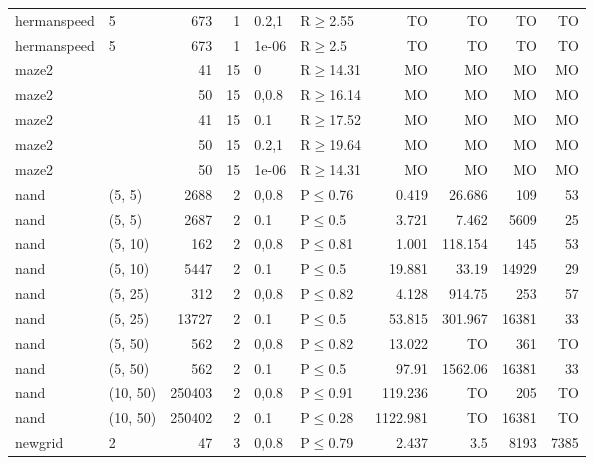 \begin{longtable}{llrrllrrrr}
 hermanspeed   & 5        &    	673 &   1 & 0.2,1 & R$\geq$2.55  & TO       & TO      & TO      & TO      \\
 hermanspeed   & 5        &    	673 &   1 & 1e-06 & R$\geq$2.5   & TO       & TO      & TO      & TO      \\
 maze2         &          &     	41 &  15 & 0     & R$\geq$14.31 & MO       & MO      & MO      & MO      \\
 maze2         &          &     	50 &  15 & 0,0.8 & R$\geq$16.14 & MO       & MO      & MO      & MO      \\
 maze2         &          &     	41 &  15 & 0.1   & R$\geq$17.52 & MO       & MO      & MO      & MO      \\
 maze2         &          &     	50 &  15 & 0.2,1 & R$\geq$19.64 & MO       & MO      & MO      & MO      \\
 maze2         &          &     	50 &  15 & 1e-06 & R$\geq$14.31 & MO       & MO      & MO      & MO      \\
 nand          & (5, 5)   &   	2688 &   2 & 0,0.8 & P$\leq$0.76  & 0.419    & 26.686  & 109     & 53      \\
 nand          & (5, 5)   &   	2687 &   2 & 0.1   & P$\leq$0.5   & 3.721    & 7.462   & 5609    & 25      \\
 nand          & (5, 10)  &    	162 &   2 & 0,0.8 & P$\leq$0.81  & 1.001    & 118.154 & 145     & 53      \\
 nand          & (5, 10)  &   	5447 &   2 & 0.1   & P$\leq$0.5   & 19.881   & 33.19   & 14929   & 29      \\
 nand          & (5, 25)  &    	312 &   2 & 0,0.8 & P$\leq$0.82  & 4.128    & 914.75  & 253     & 57      \\
 nand          & (5, 25)  &  	13727 &   2 & 0.1   & P$\leq$0.5   & 53.815   & 301.967 & 16381   & 33      \\
 nand          & (5, 50)  &    	562 &   2 & 0,0.8 & P$\leq$0.82  & 13.022   & TO      & 361     & TO      \\
 nand          & (5, 50)  &    	562 &   2 & 0.1   & P$\leq$0.5   & 97.91    & 1562.06 & 16381   & 33      \\
 nand          & (10, 50) & 	250403 &   2 & 0,0.8 & P$\leq$0.91  & 119.236  & TO      & 205     & TO      \\
 nand          & (10, 50) & 	250402 &   2 & 0.1   & P$\leq$0.28  & 1122.981 & TO      & 16381   & TO      \\
 newgrid       & 2        &     	47 &   3 & 0,0.8 & P$\leq$0.79  & 2.437    & 3.5     & 8193    & 7385    \\

\end{longtable}
